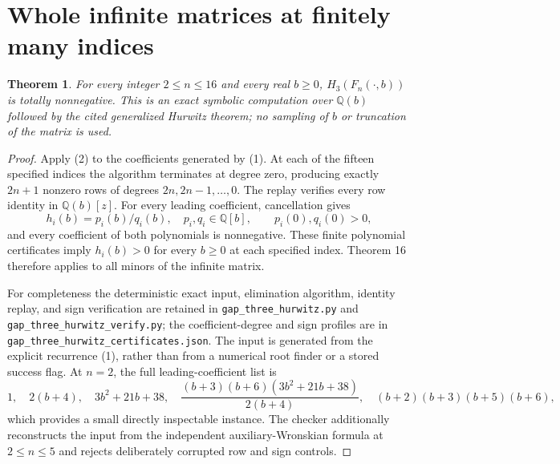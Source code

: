 \documentclass[11pt]{article}
\newtheorem{theorem}{Theorem}
\begin{document}
\section{Whole infinite matrices at finitely many indices}
\begin{theorem}\label{thm:block}
For every integer $2\le n\le16$ and every real $b\ge0$,
$H_3(F_n(\cdot,b))$ is totally nonnegative.
This is an exact symbolic computation over $\mathbb Q(b)$ followed
by the cited generalized Hurwitz theorem; no sampling of $b$ or
truncation of the matrix is used.
\end{theorem}
\begin{proof}
Apply (2) to the coefficients generated by (1). At each of the fifteen
specified indices the algorithm terminates at degree zero, producing
exactly $2n+1$ nonzero rows of degrees $2n,2n-1,\ldots,0$.
The replay verifies every row identity in $\mathbb Q(b)[z]$.
For every leading coefficient, cancellation gives
\[
 h_i(b)=p_i(b)/q_i(b),\quad p_i,q_i\in\mathbb Q[b],\qquad
 p_i(0),q_i(0)>0,
\]
and every coefficient of both polynomials is nonnegative.
These finite polynomial certificates imply $h_i(b)>0$ for every
$b\ge0$ at each specified index. Theorem 16 therefore applies to
all minors of the infinite matrix.

For completeness the deterministic exact input, elimination algorithm,
identity replay, and sign verification are retained in
\texttt{gap\_three\_hurwitz.py} and
\texttt{gap\_three\_hurwitz\_verify.py}; the coefficient-degree and sign
profiles are in \texttt{gap\_three\_hurwitz\_certificates.json}.
The input is generated from the explicit recurrence (1), rather than
from a numerical root finder or a stored success flag.
At $n=2$, the full leading-coefficient list is
\[
 1,\quad 2(b+4),\quad 3b^2+21b+38,\quad
 \frac{(b+3)(b+6)(3b^2+21b+38)}{2(b+4)},\quad
 (b+2)(b+3)(b+5)(b+6),
\]
which provides a small directly inspectable instance.
The checker additionally reconstructs the input from the independent
auxiliary-Wronskian formula at $2\le n\le5$ and rejects deliberately
corrupted row and sign controls.
\end{proof}
\end{document}
